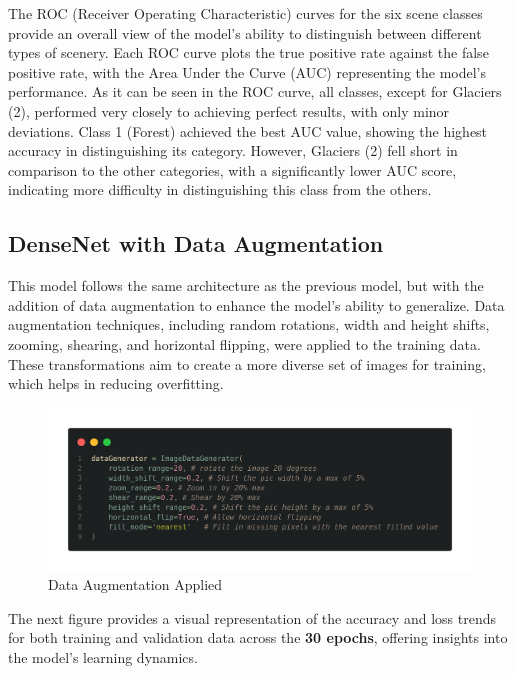 The ROC (Receiver Operating Characteristic) curves for the six scene classes provide an overall view of the model’s ability to distinguish between different types of scenery. Each ROC curve plots the true positive rate against the false positive rate, with the Area Under the Curve (AUC) representing the
model’s performance. As it can be seen in the ROC curve, all classes, except for Glaciers (2), performed very closely to achieving perfect results, with only minor deviations. Class 1 (Forest) achieved the best AUC value, showing the highest accuracy in distinguishing its category. However, Glaciers (2) fell short in comparison to the other categories, with a significantly lower AUC score, indicating more difficulty in distinguishing this class from the others.


\subsection{DenseNet with Data Augmentation}

This model follows the same architecture as the previous model, but with the addition of data augmentation to enhance the model's ability to generalize. Data augmentation techniques, including random rotations, width and height shifts, zooming, shearing, and horizontal flipping, were applied to the training data. These transformations aim to create a more diverse set of images for training, which helps in reducing overfitting.


\begin{figure}[H]
    \centering
    \includegraphics[width=1\linewidth]{images/modelo_aulas_dataaug.png}
    \caption{Data Augmentation Applied}
    \label{fig:enter-label}
\end{figure}

The next figure provides a visual representation of the accuracy and loss trends for both training and validation data across the \textbf{30 epochs}, offering insights into the model's learning dynamics.


